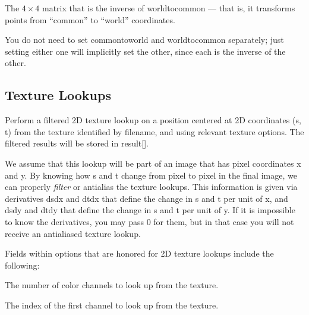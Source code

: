 The $4 \times 4$ matrix that is the inverse of {\cf worldtocommon} ---
that is, it transforms points from ``common'' to ``world'' coordinates.

You do not need to set {\cf commontoworld} and {\cf worldtocommon}
separately; just setting either one will implicitly set the other, since
each is the inverse of the other.
\apiend



\newpage
\subsection{Texture Lookups}
\label{sec:texturesys:api:texture}


Perform a filtered 2D texture lookup on a position centered at 2D
coordinates ({\cf s}, {\cf t}) from the texture identified by
{\cf filename}, and using relevant texture {\cf options}.  The filtered
results will be stored in {\cf result[]}.

We assume that this lookup will be part of an image that has pixel
coordinates {\cf x} and {\cf y}.  By knowing how {\cf s} and {\cf t}
change from pixel to pixel in the final image, we can properly
\emph{filter} or antialias the texture lookups.  This information is
given via derivatives {\cf dsdx} and {\cf dtdx} that define the change
in {\cf s} and {\cf t} per unit of {\cf x}, and {\cf dsdy} and {\cf
  dtdy} that define the change in {\cf s} and {\cf t} per unit of {\cf
  y}.  If it is impossible to know the derivatives, you may pass 0 for
them, but in that case you will not receive an antialiased texture lookup.

Fields within {\cf options} that are honored for 2D texture lookups
include the following:

\vspace{-12pt}
\vspace{10pt}
The number of color channels to look up from the texture.
\apiend

\vspace{-24pt}
\vspace{10pt}
The index of the first channel to look up from the texture.
\apiend

